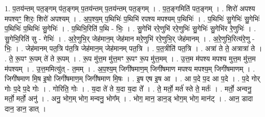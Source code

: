 \documentclass[17pt]{extarticle}
\begin{document}
1. प॒तय॑न्तम् पत॒ङ्गम् प॑त॒ङ्गम् प॒तय॑न्तम् प॒तय॑न्तम् पत॒ङ्गम् । . प॒त॒ङ्गमिति॑ पत॒ङ्गम् । . शिरो॑ अपश्य मपश्यꣳ॒॒ शिरः॒ शिरो॑ अपश्यम् । . अ॒प॒श्य॒म् प॒थिभिः॑ प॒थिभि॑ रपश्य मपश्यम् प॒थिभिः॑ । . प॒थिभिः॑ सु॒गेभिः॑ सु॒गेभिः॑ प॒थिभिः॑ प॒थिभिः॑ सु॒गेभिः॑ । . प॒थिभि॒रिति॑ प॒थि - भिः॒ । . सु॒गेभि॑ ररे॒णुभि॑ ररे॒णुभिः॑ सु॒गेभिः॑ सु॒गेभि॑र रे॒णुभिः॑ । . सु॒गेभि॒रिति॑ सु - गेभिः॑ । . अ॒रे॒णुभि॒र् जेह॑मान॒म् जेह॑मान मरे॒णुभि॑ ररे॒णुभि॒र् जेह॑मानम् । . अ॒रे॒णुभि॒रित्य॑रे॒णु - भिः॒ । . जेह॑मानम् पत॒त्रि प॑त॒त्रि जेह॑मान॒म् जेह॑मानम् पत॒त्रि । . प॒त॒त्रीति॑ पत॒त्रि । . अत्रा॑ ते ते॒ अत्रात्रा॑ ते । . ते॒ रू॒पꣳ रू॒पम् ते॑ ते रू॒पम् । . रू॒प मु॑त्त॒म मु॑त्त॒मꣳ रू॒पꣳ रू॒प मु॑त्त॒मम् । . उ॒त्त॒म म॑पश्य मपश्य मुत्त॒म मु॑त्त॒म म॑पश्यम् । . उ॒त्त॒ममित्यु॑त् - त॒मम् । . अ॒प॒श्य॒म् जिगी॑षमाण॒म् जिगी॑षमाण मपश्य मपश्य॒म् जिगी॑षमाणम् । . जिगी॑षमाण मि॒ष इ॒षो जिगी॑षमाण॒म् जिगी॑षमाण मि॒षः । . इ॒ष एष इ॒ष आ । . आ प॒दे प॒द आ प॒दे । . प॒दे गोर् गोः प॒दे प॒दे गोः । . गोरिति॒ गोः । . य॒दा ते॑ ते य॒दा य॒दा ते᳚ । . ते॒ मर्तो॒ मर्त॑ स्ते ते॒ मर्तः॑ । . मर्तो॒ अन्वनु॒ मर्तो॒ मर्तो॒ अनु॑ । . अनु॒ भोग॒म् भोग॒ मन्वनु॒ भोग᳚म् । . भोग॒ मान॒ डान॒ड् भोग॒म् भोग॒ मान॑ट् । . आन॒ डादा दान॒ डान॒ डात् । \newline
\end{document}
